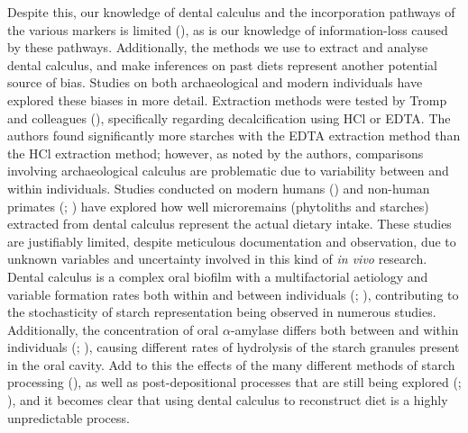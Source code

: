 \documentclass[
  b5paper,
]{book}
\begin{document}
Despite this, our knowledge of dental calculus and the incorporation
pathways of the various markers is limited
(), as is our
knowledge of information-loss caused by these pathways. Additionally,
the methods we use to extract and analyse dental calculus, and make
inferences on past diets represent another potential source of bias.
Studies on both archaeological and modern individuals have explored
these biases in more detail. Extraction methods were tested by Tromp and
colleagues (), specifically
regarding decalcification using HCl or EDTA. The authors found
significantly more starches with the EDTA extraction method than the HCl
extraction method; however, as noted by the authors, comparisons
involving archaeological calculus are problematic due to variability
between and within individuals. Studies conducted on modern humans
() and
non-human primates (; ) have explored how well microremains (phytoliths and
starches) extracted from dental calculus represent the actual dietary
intake. These studies are justifiably limited, despite meticulous
documentation and observation, due to unknown variables and uncertainty
involved in this kind of \emph{in vivo} research. Dental calculus is a
complex oral biofilm with a multifactorial aetiology and variable
formation rates both within and between individuals
(;
),
contributing to the stochasticity of starch representation being
observed in numerous studies. Additionally, the concentration of oral
\(\alpha\)-amylase differs both between and within individuals
(;
), causing
different rates of hydrolysis of the starch granules present in the oral
cavity. Add to this the effects of the many different methods of starch
processing (), as well as post-depositional processes that are still being
explored (; ), and it becomes clear that using dental calculus to
reconstruct diet is a highly unpredictable process.
\end{document}
